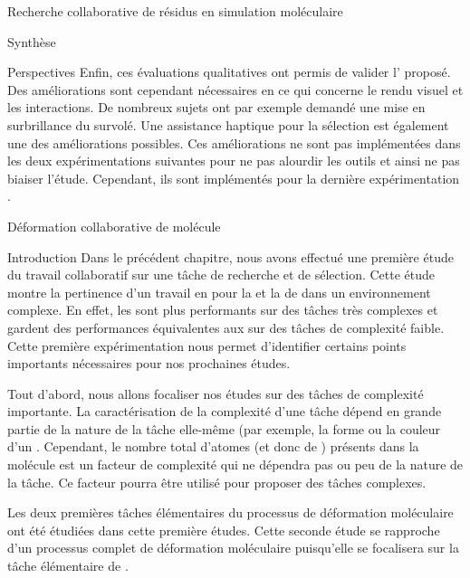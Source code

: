 \documentclass[myfrancais]{mythesis}
\begin{document}
\begin{mychapter}{Recherche collaborative de résidus en simulation moléculaire}
\begin{mysection}{Synthèse}
\begin{mysubsection}{Perspectives}
				Enfin, ces évaluations qualitatives ont permis de valider l' proposé.
				Des améliorations sont cependant nécessaires en ce qui concerne le rendu visuel et les interactions.
				De nombreux sujets ont par exemple demandé une mise en surbrillance du  survolé.
				Une assistance haptique pour la sélection est également une des améliorations possibles.
				Ces améliorations ne sont pas implémentées dans les deux expérimentations suivantes pour ne pas alourdir les outils et ainsi ne pas biaiser l'étude.
				Cependant, ils sont implémentés pour la dernière expérimentation .
			\end{mysubsection}
		\end{mysection}
	\end{mychapter}
	\begin{mychapter}{Déformation collaborative de molécule}
		\begin{mysection}{Introduction}
			Dans le précédent chapitre, nous avons effectué une première étude du travail collaboratif sur une tâche de recherche et de sélection.
			Cette étude montre la pertinence d'un travail en  pour la  et la  de  dans un environnement complexe.
			En effet, les  sont plus performants sur des tâches très complexes et gardent des performances équivalentes aux  sur des tâches de complexité faible.
			Cette première expérimentation nous permet d'identifier certains points importants nécessaires pour nos prochaines études.

			Tout d'abord, nous allons focaliser nos études sur des tâches de complexité importante.
			La caractérisation de la complexité d'une tâche dépend en grande partie de la nature de la tâche elle-même (par exemple, la forme ou la couleur d'un .
			Cependant, le nombre total d'atomes (et donc de ) présents dans la molécule est un facteur de complexité qui ne dépendra pas ou peu de la nature de la tâche.
			Ce facteur pourra être utilisé pour proposer des tâches complexes.

			Les deux premières tâches élémentaires du processus de déformation moléculaire  ont été étudiées dans cette première études.
			Cette seconde étude se rapproche d'un processus complet de déformation moléculaire puisqu'elle se focalisera sur la tâche élémentaire de .


\end{mysection}
\end{mychapter}
\end{document}
